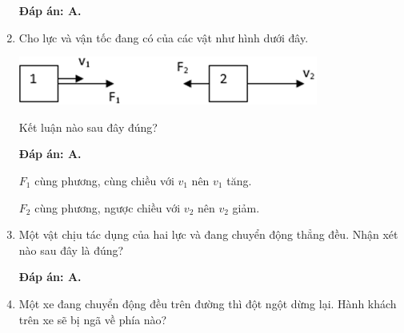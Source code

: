 \begin{enumerate}[label=\bfseries Câu \arabic*:,leftmargin=1.5cm]
	\hideall
	{\textbf{Đáp án: A.}
		
	}
	
	\item {}
	
	
	{Cho lực và vận tốc đang có của các vật như hình dưới đây.
		\begin{center}
			\includegraphics[scale=1]{../figs/VN10-2021-PH-TP0002-1.png}
		\end{center}
		Kết luận nào sau đây đúng?
	}
	
	\hideall
	{	\textbf{Đáp án: A.}
		
		$F_1$ cùng phương, cùng chiều với $v_1$ nên $v_1$ tăng.
		
		$F_2$ cùng phương, ngược chiều với $v_2$ nên $v_2$ giảm.
		
	}
	\item {}
	
	
	{Một vật chịu tác dụng của hai lực và đang chuyển động thẳng đều. Nhận xét nào sau đây là đúng?
	}
	
	\hideall
	{\textbf{Đáp án: A.}	
		
		
	}
	\item {}
	
	
	{Một xe đang chuyển động đều trên đường thì đột ngột dừng lại. Hành khách trên xe sẽ bị ngã về phía nào?
		
		
}
\end{enumerate}
